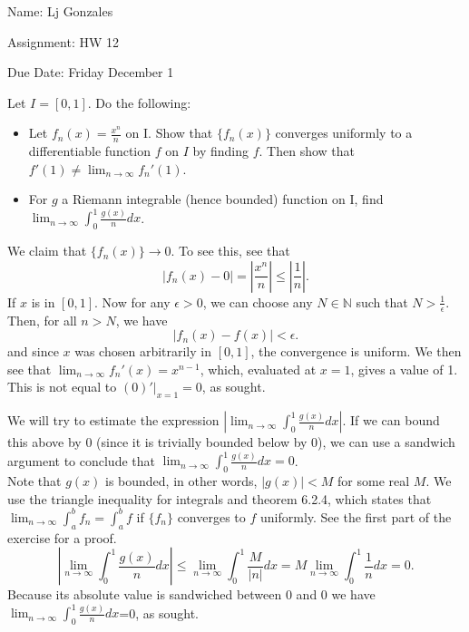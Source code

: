 \documentclass[11 pt]{article}
\begin{document}
    Name: Lj Gonzales

    Assignment: HW 12

    Due Date: Friday December 1
    \break
\begin{problem}
\end{problem}
\begin{solution}
\end{solution} 
\pagebreak
\begin{problem}
	Let $I=[0,1]$. Do the following:
	 \begin{itemize}
		 \item Let $f_n(x)=\frac{x^n}{n}$ on I. Show that $\{f_n(x)\}$ converges uniformly to a differentiable function $f$ on $I$ by finding $f$. Then show that $f'(1)\neq \lim_{n\to\infty}f_n'(1)$.
	         \item For $g$ a Riemann integrable (hence bounded) function on I, find $\lim_{n\to\infty}\int_{0}^{1}\frac{g(x)}{n}dx$.
	\end{itemize}
\end{problem}
\begin{solution}
	We claim that $\{f_n(x)\}\to 0$. To see this, see that 
	 \[
	|f_n(x)-0|=|\frac{x^n}{n}|\leq|\frac{1}{n}|
	.\] 
	If $x$ is in  $[0,1]$. Now for any $\epsilon>0$, we can choose any $N\in\mathbb{N}$ such that $N>\frac{1}{\epsilon}$. Then, for all $n>N$, we have
	 \[
	|f_n(x)-f(x)|<\epsilon
	.\] 
	and since $x$ was chosen arbitrarily in $[0,1]$, the convergence is uniform. We then see that $\lim_{n\to\infty}f_n'(x)=x^{n-1}$, which, evaluated at $x=1$, gives a value of 1. This is not equal to $(0)'|_{x=1}=0$, as sought.
\end{solution}
\begin{solution}
	We will try to estimate the expression $|\lim_{n\to\infty}\int_{0}^{1}\frac{g(x)}{n}dx|$. If we can bound this above by 0 (since it is trivially bounded below by 0), we can use a sandwich argument to conclude that $\lim_{n\to\infty}\int_{0}^{1}\frac{g(x)}{n}dx=0$.\\
	Note that $g(x)$ is bounded, in other words, $|g(x)|<M$ for some real $M$. We use the triangle inequality for integrals and theorem 6.2.4, which states that  $\lim_{n\to\infty}\int_{a}^{b}f_n = \int^{b}_{a}f$ if $\{f_n\}$ converges to $f$ uniformly. See the first part of the exercise for a proof.
	 \[
	|\lim_{n\to\infty}\int_{0}^{1}\frac{g(x)}{n}dx|\leq\lim_{n\to\infty}\int_{0}^{1}\frac{M}{|n|}dx=M\lim_{n\to\infty}\int_{0}^{1}\frac{1}{n}dx=0
	.\] 
Because its absolute value is sandwiched between 0 and 0 we have $\lim_{n\to\infty}\int_{0}^{1}\frac{g(x)}{n}dx$=0, as sought.
\end{solution}
\end{document}
